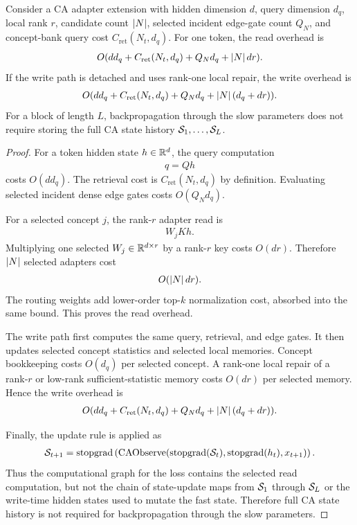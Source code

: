 \begin{theorem}
\label{thm:dgm-layer-cost:formal}
Consider a CA adapter extension with hidden dimension $d$, query dimension $d_q$, local rank $r$, candidate count $\left\lvert N\right\rvert$, selected incident edge-gate count $Q_N$, and concept-bank query cost $C_{\mathrm{ret}}(N_t,d_q)$. For one token, the read overhead is
\begin{align*}
O(dd_q+C_{\mathrm{ret}}(N_t,d_q)+Q_N d_q+\left\lvert N\right\rvert dr).
\end{align*}
If the write path is detached and uses rank-one local repair, the write overhead is
\begin{align*}
O(dd_q+C_{\mathrm{ret}}(N_t,d_q)+Q_N d_q+\left\lvert N\right\rvert(d_q+dr)).
\end{align*}
For a block of length $L$, backpropagation through the slow parameters does not require storing the full CA state history $\mathcal{S}_1,\ldots,\mathcal{S}_L$.
\end{theorem}
\begin{proof}
For a token hidden state $h\in\mathbb{R}^d$, the query computation
\begin{align*}
q=Qh
\end{align*}
costs $O(dd_q)$. The retrieval cost is $C_{\mathrm{ret}}(N_t,d_q)$ by definition. Evaluating selected incident dense edge gates costs $O(Q_N d_q)$.

For a selected concept $j$, the rank-$r$ adapter read is
\begin{align*}
W_jKh.
\end{align*}
Multiplying one selected $W_j\in\mathbb{R}^{d\times r}$ by a rank-$r$ key costs $O(dr)$. Therefore $\left\lvert N\right\rvert$ selected adapters cost
\begin{align*}
O(\left\lvert N\right\rvert dr).
\end{align*}
The routing weights add lower-order top-$k$ normalization cost, absorbed into the same bound. This proves the read overhead.

The write path first computes the same query, retrieval, and edge gates. It then updates selected concept statistics and selected local memories. Concept bookkeeping costs $O(d_q)$ per selected concept. A rank-one local repair of a rank-$r$ or low-rank sufficient-statistic memory costs $O(dr)$ per selected memory. Hence the write overhead is
\begin{align*}
O(dd_q+C_{\mathrm{ret}}(N_t,d_q)+Q_N d_q+\left\lvert N\right\rvert(d_q+dr)).
\end{align*}

Finally, the update rule is applied as
\begin{align*}
\mathcal{S}_{t+1}
=
\operatorname{stopgrad}\left(
\operatorname{CAObserve}(\operatorname{stopgrad}(\mathcal{S}_t),\operatorname{stopgrad}(h_t),x_{t+1})
\right).
\end{align*}
Thus the computational graph for the loss contains the selected read computation, but not the chain of state-update maps from $\mathcal{S}_1$ through $\mathcal{S}_L$ or the write-time hidden states used to mutate the fast state. Therefore full CA state history is not required for backpropagation through the slow parameters.
\end{proof}

